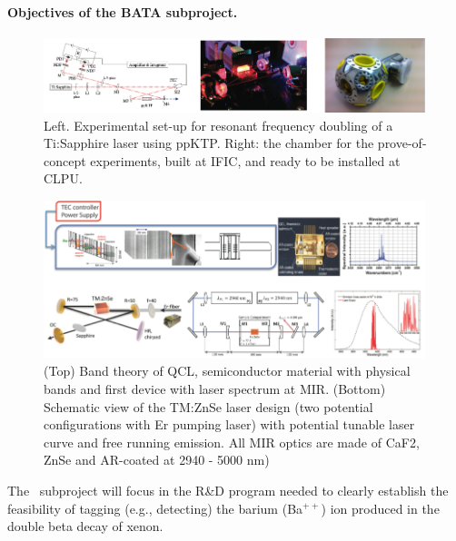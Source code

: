 \paragraph{Objectives of the BATA subproject.}

\begin{figure}
\begin{center}
\includegraphics[width=0.99\textwidth]{img/blueLaser.png}
\caption{\small Left. Experimental set-up for resonant frequency doubling of a 
Ti:Sapphire laser using ppKTP. Right: the chamber for the prove-of-concept experiments, built at IFIC, and ready to be installed at CLPU.}
\label{fig:chamber}
\end{center}
\end{figure}

\begin{figure}[h!]
\begin{center}
\includegraphics[width=0.99\textwidth]{img/MIR.png}
\end{center}
\caption{\label{Fig:MIR} (Top) Band theory of QCL, semiconductor material with physical bands and first device with laser spectrum at MIR. (Bottom) Schematic view of the TM:ZnSe laser design (two potential configurations with Er pumping laser) with potential tunable laser curve and free running emission. All MIR optics are made of CaF2, ZnSe and AR-coated at 2940 - 5000 nm) }
\end{figure}

The \BATA\ subproject will focus in the R\&D program needed to clearly establish the feasibility of tagging (e.g., detecting) the barium (Ba$^{++}$) ion produced in the double beta decay of xenon. 

